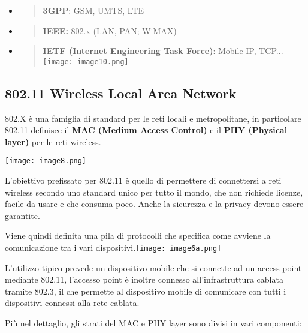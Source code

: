 \begin{itemize}
\item
  \begin{quote}
  \textbf{3GPP}: GSM, UMTS, LTE
  \end{quote}
\item
  \begin{quote}
  \textbf{IEEE:} 802.x (LAN, PAN; WiMAX)
  \end{quote}
\item
  \begin{quote}
  \textbf{IETF (Internet Engineering Task Force)}: Mobile IP,
  TCP...\texttt{[image: image10.png]}
  \end{quote}
\end{itemize}

\subsection{802.11 Wireless Local Area
Network}\label{wireless-local-area-network}

802.X è una famiglia di standard per le reti locali e metropolitane, in
particolare 802.11 definisce il \textbf{MAC (Medium Access Control)} e
il \textbf{PHY (Physical layer)} per le reti wireless.

\texttt{[image: image8.png]}

L'obiettivo prefissato per 802.11 è quello di permettere di connettersi
a reti wireless secondo uno standard unico per tutto il mondo, che non
richiede licenze, facile da usare e che consuma poco. Anche la sicurezza
e la privacy devono essere garantite.

Viene quindi definita una pila di protocolli che specifica come avviene
la comunicazione tra i vari
dispositivi.\texttt{[image: image6a.png]}

L'utilizzo tipico prevede un dispositivo mobile che si connette ad un
access point mediante 802.11, l'accesso point è inoltre connesso
all'infrastruttura cablata tramite 802.3, il che permette al dispositivo
mobile di comunicare con tutti i dispositivi connessi alla rete cablata.

Più nel dettaglio, gli strati del MAC e PHY layer sono divisi in vari
componenti:

